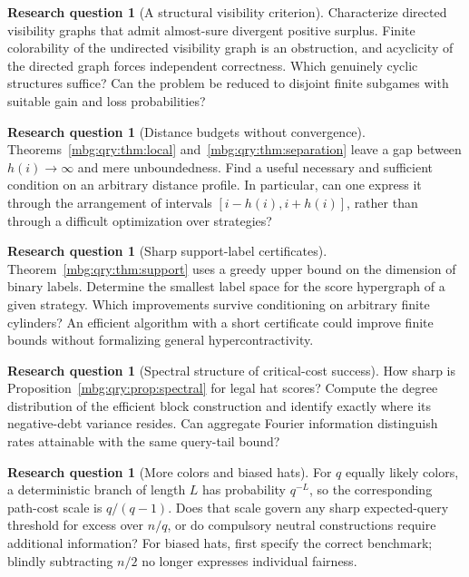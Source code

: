 \documentclass[11pt,letterpaper]{article}
\theoremstyle{definition}
\newtheorem{question}[theorem]{Research question}
\begin{document}
\begin{question}[A structural visibility criterion]
Characterize directed visibility graphs that admit almost-sure
divergent positive surplus. Finite colorability of the undirected
visibility graph is an obstruction, and acyclicity of the directed
graph forces independent correctness. Which genuinely cyclic
structures suffice? Can the problem be reduced to disjoint finite
subgames with suitable gain and loss probabilities?
\end{question}

\begin{question}[Distance budgets without convergence]
Theorems~\ref{mbg:qry:thm:local} and~\ref{mbg:qry:thm:separation} leave a gap between
\(h(i)\to\infty\) and mere unboundedness. Find a useful necessary and
sufficient condition on an arbitrary distance profile.
In particular, can one express it through the arrangement of
intervals \([i-h(i),i+h(i)]\), rather than through a difficult
optimization over strategies?
\end{question}

\begin{question}[Sharp support-label certificates]
Theorem~\ref{mbg:qry:thm:support} uses a greedy upper bound on the dimension of
binary labels. Determine the smallest label space for the score
hypergraph of a given strategy. Which improvements survive
conditioning on arbitrary finite cylinders? An efficient algorithm
with a short certificate could improve finite bounds without
formalizing general hypercontractivity.
\end{question}

\begin{question}[Spectral structure of critical-cost success]
How sharp is Proposition~\ref{mbg:qry:prop:spectral} for legal hat scores?
Compute the degree distribution of the efficient block construction
and identify exactly where its negative-debt variance resides.
Can aggregate Fourier information distinguish rates attainable with
the same query-tail bound?
\end{question}

\begin{question}[More colors and biased hats]
For \(q\) equally likely colors, a deterministic branch of length \(L\)
has probability \(q^{-L}\), so the corresponding path-cost scale is
\(q/(q-1)\). Does that scale govern any sharp expected-query
threshold for excess over \(n/q\), or do compulsory neutral
constructions require additional information?
For biased hats, first specify the correct benchmark; blindly
subtracting \(n/2\) no longer expresses individual fairness.
\end{question}
\end{document}
